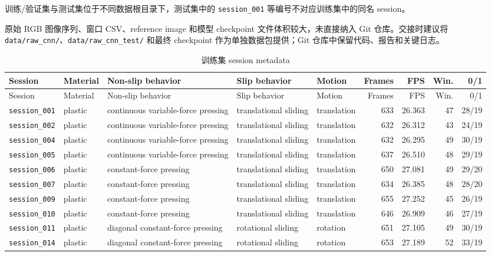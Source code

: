 \documentclass[UTF8,a4paper,11pt]{ctexart}
\begin{document}
训练/验证集与测试集位于不同数据根目录下，测试集中的 \texttt{session\_001} 等编号不对应训练集中的同名 session。

原始 RGB 图像序列、窗口 CSV、reference image 和模型 checkpoint 文件体积较大，未直接纳入 Git 仓库。交接时建议将 \texttt{data/raw\_cnn/}、\texttt{data/raw\_cnn\_test/} 和最终 checkpoint 作为单独数据包提供；Git 仓库中保留代码、报告和关键日志。

\scriptsize
\begin{longtable}{lp{1.55cm}p{2.7cm}p{2.65cm}lrrrr}
\caption{训练集 session metadata}\\
\toprule
Session & Material & Non-slip behavior & Slip behavior & Motion & Frames & FPS & Win. & 0/1 \\
\midrule
\endfirsthead
\toprule
Session & Material & Non-slip behavior & Slip behavior & Motion & Frames & FPS & Win. & 0/1 \\
\midrule
\endhead
\texttt{session\_001} & plastic & continuous variable-force pressing & translational sliding & translation & 633 & 26.363 & 47 & 28/19 \\
\texttt{session\_002} & plastic & continuous variable-force pressing & translational sliding & translation & 632 & 26.312 & 43 & 24/19 \\
\texttt{session\_004} & plastic & continuous variable-force pressing & translational sliding & translation & 632 & 26.295 & 49 & 30/19 \\
\texttt{session\_005} & plastic & continuous variable-force pressing & translational sliding & translation & 637 & 26.510 & 48 & 29/19 \\
\texttt{session\_006} & plastic & constant-force pressing & translational sliding & translation & 650 & 27.081 & 49 & 29/20 \\
\texttt{session\_007} & plastic & constant-force pressing & translational sliding & translation & 634 & 26.385 & 48 & 28/20 \\
\texttt{session\_009} & plastic & constant-force pressing & translational sliding & translation & 655 & 27.252 & 45 & 26/19 \\
\texttt{session\_010} & plastic & constant-force pressing & translational sliding & translation & 646 & 26.909 & 46 & 27/19 \\
\texttt{session\_011} & plastic & diagonal constant-force pressing & rotational sliding & rotation & 651 & 27.105 & 49 & 30/19 \\
\texttt{session\_014} & plastic & diagonal constant-force pressing & rotational sliding & rotation & 653 & 27.189 & 52 & 33/19 \\

\end{longtable}
\end{document}
